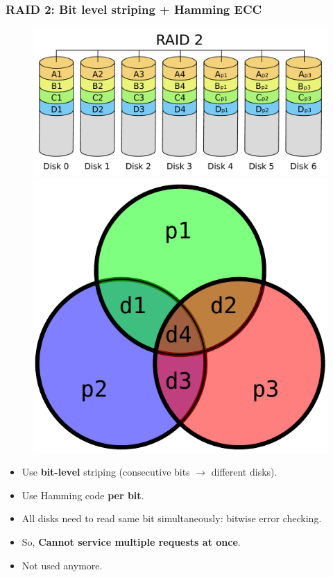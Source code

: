 \documentclass{beamer}
\begin{document}
\begin{frame}
    \frametitle{RAID 2: Bit level striping + Hamming ECC}
    \begin{figure}
    \includegraphics[height=0.3\paperwidth]{RAID2.pdf}
    \includegraphics[height=0.3\paperwidth]{hamming.pdf}
    \end{figure}
    \begin{itemize}
        \item Use \textbf{bit-level} striping (consecutive bits $\rightarrow$ different disks).
        \item Use Hamming code \textbf{per bit}. \pause
        \item All disks need to read same bit simultaneously: bitwise error checking. \pause
        \item So, \textbf{Cannot service multiple requests at once}. \pause
        \item Not used anymore.
    \end{itemize}
\end{frame}
\end{document}

